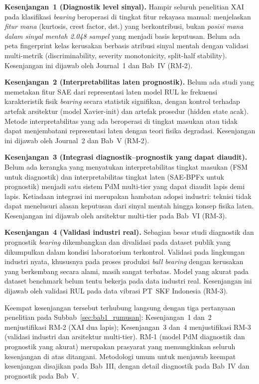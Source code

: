 \textbf{Kesenjangan~1 (Diagnostik level sinyal).} Hampir seluruh penelitian
XAI pada klasifikasi \emph{bearing} beroperasi di tingkat fitur rekayasa manual:
menjelaskan \emph{fitur mana} (kurtosis, crest factor, dst.) yang berkontribusi,
bukan \emph{posisi mana dalam sinyal mentah 2.048 sampel} yang menjadi basis
keputusan. Belum ada peta fingerprint kelas kerusakan berbasis atribusi sinyal
mentah dengan validasi multi-metrik (discriminability, severity monotonicity,
split-half stability). Kesenjangan ini dijawab oleh Journal~1 dan Bab~IV
{\color{blue}(RM-2)}.

\textbf{Kesenjangan~2 (Interpretabilitas laten prognostik).} Belum ada studi
yang memetakan fitur SAE dari representasi laten model RUL ke frekuensi
karakteristik fisik \emph{bearing} secara statistik signifikan, dengan kontrol
terhadap artefak arsitektur (model Xavier-init) dan artefak prosedur (hidden
state acak). Metode interpretabilitas yang ada beroperasi di tingkat masukan atau
tidak dapat menjembatani representasi laten dengan teori fisika degradasi.
Kesenjangan ini dijawab oleh Journal~2 dan Bab~V
{\color{blue}(RM-2)}.

\textbf{Kesenjangan~3 (Integrasi diagnostik–prognostik yang dapat diaudit).}
Belum ada kerangka yang menyatukan interpretabilitas tingkat masukan (FSM untuk
diagnostik) dan interpretabilitas tingkat laten (SAE-BPFx untuk prognostik)
menjadi satu sistem PdM multi-tier yang dapat diaudit lapis demi lapis.
Ketiadaan integrasi ini merupakan hambatan adopsi industri: teknisi tidak dapat
menelusuri alasan keputusan dari sinyal mentah hingga konsep fisika laten.
Kesenjangan ini dijawab oleh {\color{blue}arsitektur multi-tier pada Bab~VI
(RM-3)}.

{\color{blue}\textbf{Kesenjangan~4 (Validasi industri real).} Sebagian
besar studi diagnostik dan prognostik \emph{bearing} dikembangkan dan
divalidasi pada dataset publik yang dikumpulkan dalam kondisi laboratorium
terkontrol. Validasi pada lingkungan industri nyata, khususnya pada proses
produksi \emph{ball bearing} dengan kerusakan yang berkembang secara alami,
masih sangat terbatas. Model yang akurat pada dataset benchmark belum tentu
bekerja pada data industri real. Kesenjangan ini dijawab oleh validasi RUL
pada data vibrasi PT~SKF Indonesia (RM-3).}

{\color{blue}Keempat} kesenjangan tersebut terhubung langsung dengan
{\color{blue}tiga} pertanyaan penelitian
pada Subbab~\ref{sec:bab1_rumusan}: {\color{blue}Kesenjangan~1 dan~2
menjustifikasi RM-2 (XAI dua lapis); Kesenjangan~3 dan~4 menjustifikasi
RM-3 (validasi industri dan arsitektur multi-tier). RM-1 (model PdM
diagnostik dan prognostik yang akurat) merupakan prasyarat yang memungkinkan
seluruh kesenjangan di atas ditangani.} Metodologi umum untuk menjawab
{\color{blue}keempat} kesenjangan disajikan pada Bab~III, dengan detail
diagnostik pada Bab~IV dan prognostik pada Bab~V.

